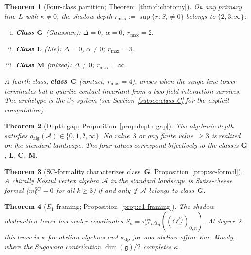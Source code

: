 \documentclass[11pt,reqno]{amsart}
\newtheorem{theorem}{Theorem}[section]
\theoremstyle{definition}
\theoremstyle{remark}
\newcommand{\cA}{\mathcal{A}}
\newcommand{\fg}{\mathfrak{g}}
\numberwithin{equation}{section}
\begin{document}
\begin{theorem}[Four-class partition;
Theorem~\ref{thm:dichotomy}]\label{thm:intro-classification}
On any primary line~$L$ with $\kappa \ne 0$, the shadow
depth $r_{\max} := \sup\{r : S_r \ne 0\}$ belongs to
$\{2, 3, \infty\}$:
\begin{enumerate}[(i)]
\item \textbf{Class $\mathbf{G}$} (Gaussian):
 $\Delta = 0$, $\alpha = 0$; $r_{\max} = 2$.
\item \textbf{Class $\mathbf{L}$} (Lie):
 $\Delta = 0$, $\alpha \ne 0$; $r_{\max} = 3$.
\item \textbf{Class $\mathbf{M}$} (mixed):
 $\Delta \ne 0$; $r_{\max} = \infty$.
\end{enumerate}
A fourth class, \textbf{class~$\mathbf{C}$} (contact,
$r_{\max} = 4$), arises when the single-line tower terminates
but a quartic contact invariant from a two-field interaction
survives. The archetype is the $\beta\gamma$ system (see
Section~\ref{subsec:class-C} for the explicit computation).
\end{theorem}

\begin{theorem}[Depth gap;
Proposition~\ref{prop:depth-gap}]\label{thm:intro-depth-gap}
The algebraic depth satisfies
$d_{\mathrm{alg}}(\cA) \in \{0, 1, 2, \infty\}$.
No value~$3$ or any finite value~$\ge 3$ is realized on the
standard landscape. The four values correspond bijectively
to the classes $\mathbf{G}$, $\mathbf{L}$, $\mathbf{C}$,
$\mathbf{M}$.
\end{theorem}

\begin{theorem}[SC-formality characterizes class~$\mathbf{G}$;
Proposition~\ref{prop:sc-formal}]\label{thm:intro-sc-formal}
A chirally Koszul vertex algebra~$\cA$ in the standard
landscape is Swiss-cheese formal
($m_k^{\mathrm{SC}} = 0$ for all $k \ge 3$) if and only
if~$\cA$ belongs to class~$\mathbf{G}$.
\end{theorem}

\begin{theorem}[$E_1$ framing;
Proposition~\ref{prop:e1-framing}]\label{thm:intro-e1}
The shadow obstruction tower has scalar coordinates
$S_n=\tau_{\cA,n}^{\mathrm{res}}q_n((\Theta_\cA^{E_1})_{0,n})$.
At degree~$2$ this trace is $\kappa$ for abelian algebras and
$\kappa_{\mathrm{dp}}$ for non-abelian affine Kac--Moody, where the
Sugawara contribution $\dim(\fg)/2$ completes $\kappa$.
\end{theorem}
\end{document}

